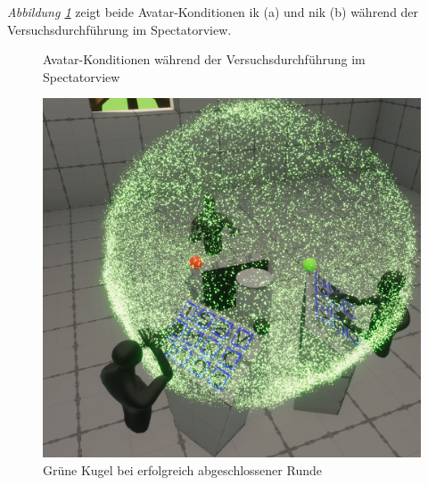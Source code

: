 \documentclass[a4paper,11pt]{article}%
\renewcommand{\\}{\vspace*{0.5\baselineskip} \newline}
\begin{document}
\textit{Abbildung \ref{AvatareImEinsatz}} zeigt beide Avatar-Konditionen \ac{ik} (a) und \ac{nik} (b) während der Versuchsdurchführung im Spectatorview.

\begin{figure}[h]
  \centering
  \qquad
  \caption[Die Avatare und der Spectatorview]{Avatar-Konditionen während der Versuchsdurchführung im Spectatorview}
  \label{AvatareImEinsatz}
\end{figure}

\begin{figure}[H]
		\begin{footnotesize}
		\centering
			\includegraphics[scale=0.2]{Abbildungen/RoundSuccsessful.JPG}	
			\caption[Der Abschluss einer Runde]{Grüne Kugel bei erfolgreich abgeschlossener Runde}
			\label{RoundFinished}
		\end{footnotesize}
	\end{figure}
	
\end{document}
